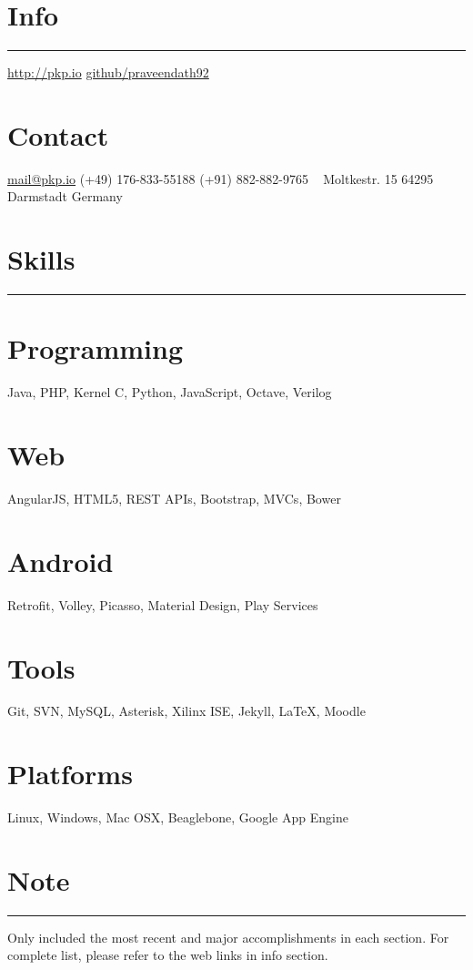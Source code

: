 \documentclass[]{friggeri-cv}
\begin{document}

\begin{aside}
  \section{Info}
    \noindent\rule{3cm}{0.5pt}
    \href{http://pkp.io}{http://pkp.io}
    \href{https://github.com/praveendath92}{github/praveendath92}    
  \section{Contact}
    \href{mailto:mail@pkp.io}{mail@pkp.io}
    (+49) 176-833-55188
    (+91) 882-882-9765
    ~
    Moltkestr. 15
    64295 Darmstadt
    Germany
    ~
  \section{Skills}
    \noindent\rule{3cm}{0.5pt}
  \section{Programming}
    Java, PHP, Kernel C, Python, JavaScript, Octave, Verilog
  \section{Web}
    AngularJS, HTML5, REST APIs, Bootstrap, MVCs, Bower
  \section{Android}
    Retrofit, Volley, Picasso, Material Design, Play Services
  \section{Tools}
    Git, SVN, MySQL, Asterisk, Xilinx ISE, Jekyll, \LaTeX, Moodle
  \section{Platforms}
    Linux, Windows, Mac OSX, Beaglebone, Google App Engine
  \section{Note}
    \noindent\rule{3cm}{0.5pt}
    Only included the most recent and major accomplishments in each section. For complete list, please refer to the web links in info section.
\end{aside}
\end{document}
